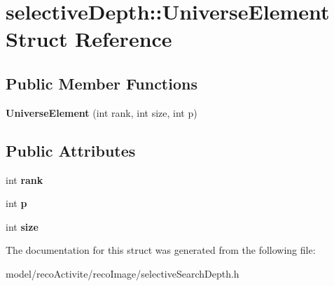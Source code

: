 \section{selective\+Depth\+:\+:Universe\+Element Struct Reference}
\label{structselective_depth_1_1_universe_element}
\subsection*{Public Member Functions}
\begin{DoxyCompactItemize}
\item 
\mbox{\label{structselective_depth_1_1_universe_element_a81058cb3a84d146f7c8021dd1fc6bc23}} 
{\bfseries Universe\+Element} (int rank, int size, int p)
\end{DoxyCompactItemize}
\subsection*{Public Attributes}
\begin{DoxyCompactItemize}
\item 
\mbox{\label{structselective_depth_1_1_universe_element_aaafa89a0de62c7f59f866fa478345665}} 
int {\bfseries rank}
\item 
\mbox{\label{structselective_depth_1_1_universe_element_ae093cfe9b66fbde7dc4d8fb467eb2fb4}} 
int {\bfseries p}
\item 
\mbox{\label{structselective_depth_1_1_universe_element_ae0f02f564db5b447123b665ba3149a1a}} 
int {\bfseries size}
\end{DoxyCompactItemize}


The documentation for this struct was generated from the following file\+:\begin{DoxyCompactItemize}
\item 
model/reco\+Activite/reco\+Image/selective\+Search\+Depth.\+h\end{DoxyCompactItemize}

